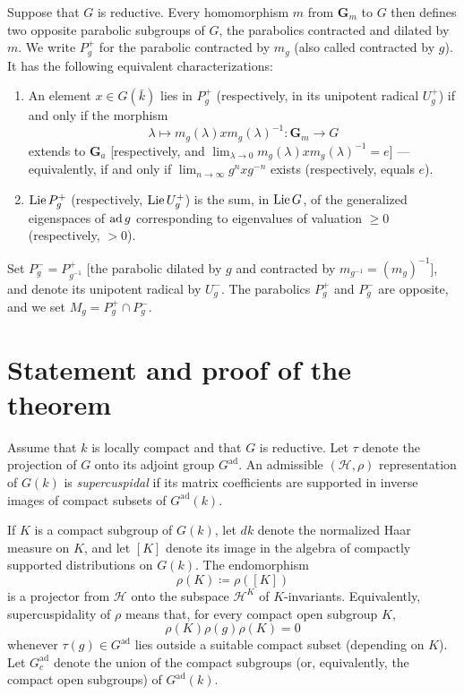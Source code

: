 Suppose that \(G\) is reductive. Every homomorphism \(m\) from
\(\mathbf{G}_m\) to \(G\) then defines two opposite parabolic subgroups of
\(G\), the parabolics contracted and dilated by \(m\). We write \(P_g^{+}\)
for the parabolic contracted by \(m_g\) (also called contracted by \(g\)). It
has the following equivalent characterizations:

\begin{enumerate}[label=(\alph*)]
\item An element \(x\in G(\bar{k})\) lies in \(P_g^{+}\) (respectively, in
  its unipotent radical \(U_g^{+}\)) if and only if the morphism
  \[
    \lambda\longmapsto m_g(\lambda)x m_g(\lambda)^{-1}:
    \mathbf{G}_m\longrightarrow G
  \]
  extends to \(\mathbf{G}_a\) [respectively, and
  \(\lim_{\lambda\to0}m_g(\lambda)x m_g(\lambda)^{-1}=e\)] --- equivalently,
  if and only if \(\lim_{n\to\infty}g^n xg^{-n}\) exists (respectively,
  equals \(e\)).

\item \(\operatorname{Lie} P_g^{+}\) (respectively, \(\operatorname{Lie} U_g^{+}\)) is the sum, in
  \(\operatorname{Lie} G\), of the generalized eigenspaces of \(\operatorname{ad} g\) corresponding to
  eigenvalues of valuation \(\geq0\) (respectively, \(>0\)).
\end{enumerate}

Set \(P_g^{-}=P_{g^{-1}}^{+}\) [the parabolic dilated by \(g\) and contracted
by \(m_{g^{-1}}=(m_g)^{-1}\)], and denote its unipotent radical by
\(U_g^{-}\). The parabolics \(P_g^{+}\) and \(P_g^{-}\) are opposite, and we
set \(M_g=P_g^{+}\cap P_g^{-}\).

\section{Statement and proof of the theorem}

Assume that \(k\) is locally compact and that \(G\) is reductive. Let \(\tau\)
denote the projection of \(G\) onto its adjoint group \(G^{\mathrm{ad}}\). An
admissible \((\mathscr{H},\rho)\) representation of
\(G(k)\) is \emph{supercuspidal} if its matrix coefficients are supported in
inverse images of compact subsets of \(G^{\mathrm{ad}}(k)\).

If \(K\) is a compact subgroup of \(G(k)\), let \(dk\) denote the normalized
Haar measure on \(K\), and let \([K]\) denote its image in the algebra of
compactly supported distributions on \(G(k)\). The endomorphism
\[
  \rho(K)\coloneqq\rho([K])
\]
is a projector from \(\mathscr{H}\) onto the subspace \(\mathscr{H}^{K}\) of
\(K\)-invariants. Equivalently, supercuspidality of \(\rho\) means that, for
every compact open subgroup \(K\),
\[
  \rho(K)\rho(g)\rho(K)=0
\]
whenever \(\tau(g)\in G^{\mathrm{ad}}\) lies outside a suitable compact subset
(depending on \(K\)). Let \(G_c^{\mathrm{ad}}\) denote the union of the compact
subgroups (or, equivalently, the compact open subgroups) of
\(G^{\mathrm{ad}}(k)\).

